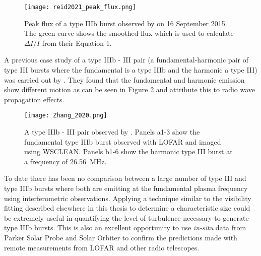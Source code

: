 \begin{figure}[ht]
\centering
\texttt{[image: reid2021\_peak\_flux.png]}
\caption[Peak flux of a type IIIb burst observed by \cite{Reid2021}.]{Peak flux of a type IIIb burst observed by \cite{Reid2021} on 16 September 2015. The green curve shows the smoothed flux which is used to calculate $\Delta I/I$ from their Equation 1.}
\label{fig:reid_peakflux}
\end{figure}

A previous case study of a type IIIb - III pair (a fundamental-harmonic pair of type III bursts where the fundamental is a type IIIb and the harmonic a type III) was carried out by \cite{Zhang2020}. They found that the fundamental and harmonic emission show different motion as can be seen in Figure \ref{fig:typeIIIbIII} and attribute this to radio wave propagation effects.

\begin{figure}[ht]
\centering
\texttt{[image: Zhang\_2020.png]}
\caption[type IIIb - III pair observed by \cite{Zhang2020}.]{A type IIIb - III pair observed by \cite{Zhang2020}. Panels a1-3 show the fundamental type IIIb burst observed with LOFAR and imaged using WSCLEAN. Panels b1-6 show the harmonic type III burst at a frequency of 26.56~MHz.}
\label{fig:typeIIIbIII}
\end{figure}

To date there has been no comparison between a large number of type III and type IIIb bursts where both are emitting at the fundamental plasma frequency using interferometric observations. Applying a technique similar to the visibility fitting described elsewhere in this thesis to determine a characteristic size could be extremely useful in quantifying the level of turbulence necessary to generate type IIIb bursts. This is also an excellent opportunity to use \textit{in-situ} data from Parker Solar Probe \citep[PSP;][]{Fox2016} and Solar Orbiter \citep{Muller2020} to confirm the predictions made with remote measurements from LOFAR and other radio telescopes. 


